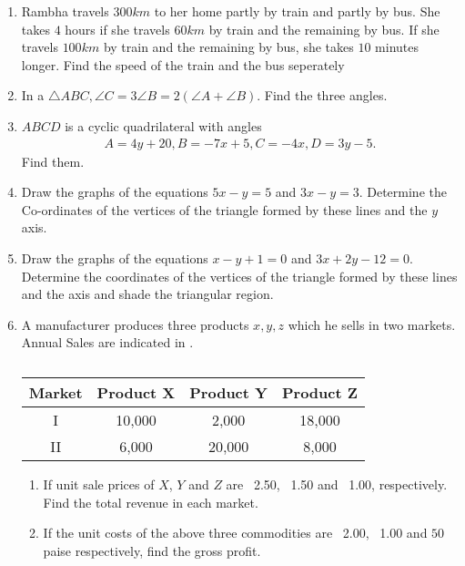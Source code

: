 \begin{enumerate}[label=\thesubsection.\arabic*, ref=\thesubsection.\theenumi]
\item Rambha travels $300 km$ to her home partly by train and partly by bus. She takes $4$ hours if she travels $60km$ by train and the remaining by bus. If she travels $100km$ by train and the remaining by bus,  she takes $10$ minutes longer. Find the speed of the train and the bus seperately
\item In a $\triangle ABC,  \angle C=3 \angle B=2(\angle A+\angle B)$.  Find the three angles. 
\item $ABCD$ is a cyclic quadrilateral 
	with angles
\begin{align}
	A = 4y+20,  B = -7x+5,  C = -4x,  D = 3y-5. 
\end{align}
Find them.  
\item Draw the graphs of the equations $5x-y=5$ and $3x-y=3$.  Determine the Co-ordinates of the vertices of the triangle formed by these lines and the $y$ axis. 
\item Draw the graphs of the equations $x-y+1=0$ and $3x+2y-12=0$.  Determine the coordinates of the vertices of the triangle formed by these lines and the axis and shade the triangular region. 
\item A manufacturer produces three products $x, y, z$ which he sells in two markets. Annual Sales are indicated 
	in .
		\begin{table}[H]
\centering
\begin{tabular}{|c|c|c|c|}
\hline
Market &  Product X & Product Y & Product Z\\
\hline
I &10,000 &2,000 &18,000\\
\hline
II &6,000 &20,000 &8,000\\
\hline
\end{tabular}
\caption{}
	\label{tab:appl-mat}
\end{table}
\begin{enumerate}
\item If unit sale prices of $X$, $Y$ and $Z$ are \rupee~2.50, \rupee~1.50 and \rupee~1.00, respectively. Find the total revenue in each market. 
\item If the unit costs of the above three commodities are \rupee~2.00, \rupee~1.00 and $50$ paise respectively, find the gross profit.
\end{enumerate}
\end{enumerate}
